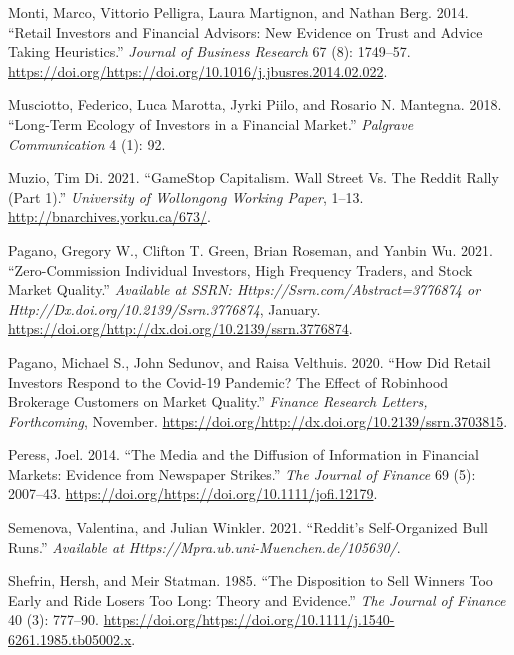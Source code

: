 \documentclass[12pt,]{article}
\begin{document}
\leavevmode\hypertarget{ref-monti2014}{}%
Monti, Marco, Vittorio Pelligra, Laura Martignon, and Nathan Berg. 2014.
``Retail Investors and Financial Advisors: New Evidence on Trust and
Advice Taking Heuristics.'' \emph{Journal of Business Research} 67 (8):
1749--57.
\url{https://doi.org/https://doi.org/10.1016/j.jbusres.2014.02.022}.

\leavevmode\hypertarget{ref-musciotto2018}{}%
Musciotto, Federico, Luca Marotta, Jyrki Piilo, and Rosario N. Mantegna.
2018. ``Long-Term Ecology of Investors in a Financial Market.''
\emph{Palgrave Communication} 4 (1): 92.

\leavevmode\hypertarget{ref-dimuzio2021}{}%
Muzio, Tim Di. 2021. ``GameStop Capitalism. Wall Street Vs. The Reddit
Rally (Part 1).'' \emph{University of Wollongong Working Paper}, 1--13.
\url{http://bnarchives.yorku.ca/673/}.

\leavevmode\hypertarget{ref-eaton2021}{}%
Pagano, Gregory W., Clifton T. Green, Brian Roseman, and Yanbin Wu.
2021. ``Zero-Commission Individual Investors, High Frequency Traders,
and Stock Market Quality.'' \emph{Available at SSRN:
Https://Ssrn.com/Abstract=3776874 or
Http://Dx.doi.org/10.2139/Ssrn.3776874}, January.
\url{https://doi.org/http://dx.doi.org/10.2139/ssrn.3776874}.

\leavevmode\hypertarget{ref-pagano2020}{}%
Pagano, Michael S., John Sedunov, and Raisa Velthuis. 2020. ``How Did
Retail Investors Respond to the Covid-19 Pandemic? The Effect of
Robinhood Brokerage Customers on Market Quality.'' \emph{Finance
Research Letters, Forthcoming}, November.
\href{https://doi.org/http://dx.doi.org/10.2139/ssrn.3703815\%20}{https://doi.org/http://dx.doi.org/10.2139/ssrn.3703815}.

\leavevmode\hypertarget{ref-peress2014}{}%
Peress, Joel. 2014. ``The Media and the Diffusion of Information in
Financial Markets: Evidence from Newspaper Strikes.'' \emph{The Journal
of Finance} 69 (5): 2007--43.
\url{https://doi.org/https://doi.org/10.1111/jofi.12179}.

\leavevmode\hypertarget{ref-semenova2021}{}%
Semenova, Valentina, and Julian Winkler. 2021. ``Reddit's Self-Organized
Bull Runs.'' \emph{Available at
Https://Mpra.ub.uni-Muenchen.de/105630/}.

\leavevmode\hypertarget{ref-shefrin1985}{}%
Shefrin, Hersh, and Meir Statman. 1985. ``The Disposition to Sell
Winners Too Early and Ride Losers Too Long: Theory and Evidence.''
\emph{The Journal of Finance} 40 (3): 777--90.
\url{https://doi.org/https://doi.org/10.1111/j.1540-6261.1985.tb05002.x}.
\end{document}

